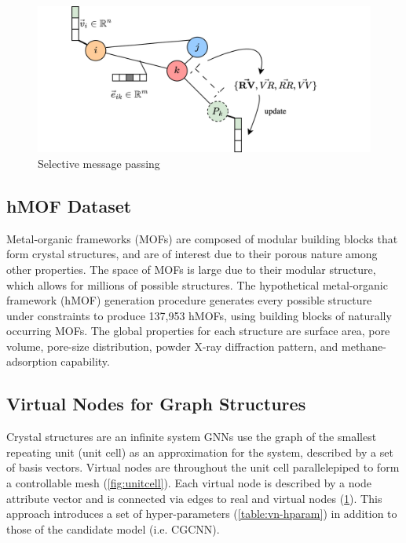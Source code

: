 \documentclass{lxaiproposal}
\begin{document}
\begin{figure}[h]
    \centering
    \includegraphics[scale=0.15]{graph-rep-vn.drawio.png}
    \caption{Selective message passing}
    \label{fig:messagep}
\end{figure}

\subsection*{hMOF Dataset}

Metal-organic frameworks (MOFs) are composed of modular building blocks that form crystal structures, and are of interest due to their porous nature among other properties. The space of  MOFs is large due to their modular structure, which allows for millions of possible structures. The hypothetical metal-organic framework (hMOF) generation procedure generates every possible structure under constraints to produce 137,953 hMOFs, using building blocks of naturally occurring MOFs. The global properties for each structure are surface area, pore volume, pore-size distribution, powder X-ray diffraction pattern, and methane-adsorption capability\cite{wilmer2012large}.

\subsection*{Virtual Nodes for Graph Structures}

Crystal structures are an infinite system GNNs use the graph of the smallest repeating unit (unit cell) as an approximation for the system, described by a set of basis vectors. Virtual nodes are throughout the unit cell parallelepiped to form a controllable mesh (\ref{fig:unitcell}). Each virtual node is described by a node attribute vector and is connected via edges to real and virtual nodes (\ref{fig:messagep}). This approach introduces a set of hyper-parameters (\ref{table:vn-hparam}) in addition to those of the candidate model (i.e. CGCNN).
\end{document}
